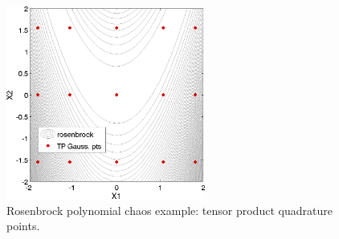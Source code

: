 \begin{figure}[ht!]
  \centering
  \includegraphics[height=2.5in]{images/rosen_pce_pts}
  \caption{Rosenbrock polynomial chaos example: tensor product quadrature points.}
  \label{tutorial:rosen_pce_points}
\end{figure}

